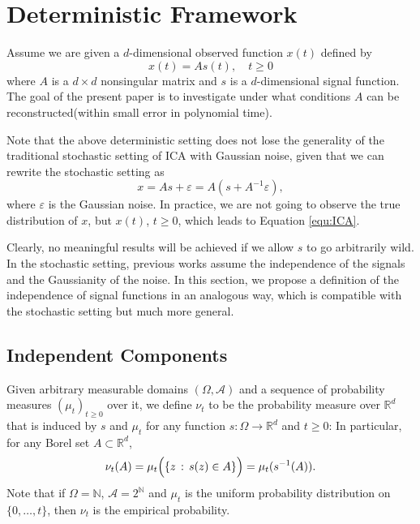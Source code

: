 \documentclass[twoside]{article}
\newcommand{\cset}[2]{\left\{#1\,:\,#2\right\}}
\newcommand{\ra}{\rightarrow}
\newcommand{\real}{\mathbb{R}}
\renewcommand{\natural}{\mathbb{N}}
\theoremstyle{definition}
\renewcommand{\AA}{\mathcal{A}}
\newcommand{\eps}{\varepsilon}
\begin{document}
\section{Deterministic Framework}
\label{sec:DeterFrame}

Assume we are given a $d$-dimensional observed function $x(t)$ defined by  
\begin{equation}
\label{equ:ICA}
x(t) = As(t), \quad t\ge0
\end{equation}
where $A$ is a $d\times d$ nonsingular matrix and  $s$ is a $d$-dimensional signal function. 
The goal of the present paper is to investigate under what conditions $A$ can be reconstructed(within small error in polynomial time).

Note that the above deterministic setting does not lose the generality of the traditional stochastic setting of ICA with Gaussian noise, given that we can rewrite the stochastic setting as 
\[
x = As+\eps = A(s+A^{-1}\eps),
\] 
where $\eps$ is the Gaussian noise. In practice, we are not going to observe the true distribution of $x$, but $x(t)$, $t\ge 0$, which leads to Equation \eqref{equ:ICA}.

Clearly, no meaningful results will be achieved if we allow $s$ to go arbitrarily wild. 
In the stochastic setting, previous works assume the independence of the signals and the Gaussianity of the noise. 
In this section, we propose a definition of the independence of signal functions in an analogous way, which is compatible with the stochastic setting but much more general.

\subsection{Independent Components}
\label{subsec:IndeComp}
Given arbitrary measurable domains $(\Omega,\AA)$ and a sequence of probability measures $(\mu_t)_{t\ge0}$ over it, we define $\nu_t$ to be the probability measure over $\real^d$ that is induced by $s$ and $\mu_t$ for any function $s: \Omega \ra \real^d$ and $t\ge 0$:
In particular, for any Borel set $A\subset \real^d$,
\[
\nu_t(A)= \mu_t\Bigl( \cset{z}{s(z)\in A} \Bigr)
= \mu_t ( s^{-1}(A) ).
\]
Note that if $\Omega = \natural$, $\AA = 2^\natural$ and $\mu_t$ is the uniform probability distribution on $\{0,\ldots,t\}$, then $\nu_t$ is the empirical probability.
\end{document}
